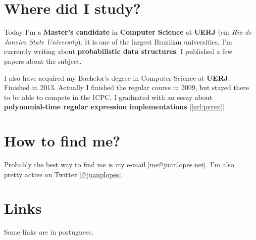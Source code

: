 \documentclass[a4paper,12pt,oneside]{article}
\begin{document}
\section*{Where did I study?}

	Today I'm a \textbf{Master's candidate} in \textbf{Computer Science} at
	\textbf{UERJ} (en: \emph{Rio de Janeiro State University}). It is one of the
	largest Brazilian universities. I'm currently writing about \textbf{probabilistic data structures}.
	I published a few papers about the subject.

	I also have acquired my Bachelor's degree in Computer Science at \textbf{UERJ}.
	Finished in 2013. Actually I finished the regular course in 2009, but stayed
	there to be able to compete in the ICPC. I graduated with an essay about
	\textbf{polynomial-time regular expression implementations} [\ref{url:pyrex}].

\section*{How to find me?}

	Probably the best way to find me is my e-mail
	[\href{mailto:me@juanlopes.net}{me@juanlopes.net}]. I'm also pretty active on
	Twitter [\href{http://twitter.com/juanplopes}{@juanplopes}].

\section*{Links}

	Some links are in portuguese.
\end{document}
